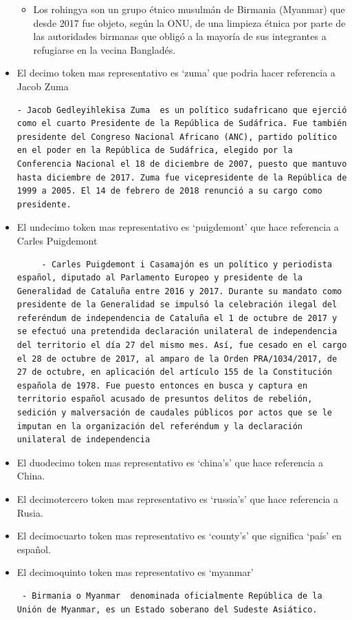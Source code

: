 \documentclass[
  11pt,
  a4paper,
]{article}
\providecommand{\tightlist}{%
  \setlength{\itemsep}{0pt}\setlength{\parskip}{0pt}}
\begin{document}
\begin{itemize}
  \begin{itemize}
  \tightlist
  \item
    Los rohingya son un grupo étnico musulmán de Birmania (Myanmar) que
    desde 2017 fue objeto, según la ONU, de una limpieza étnica por
    parte de las autoridades birmanas que obligó a la mayoría de sus
    integrantes a refugiarse en la vecina Bangladés.
  \end{itemize}
\item
  El decimo token mas representativo es `zuma' que podria hacer
  referencia a Jacob Zuma

\begin{verbatim}
- Jacob Gedleyihlekisa Zuma  es un político sudafricano que ejerció como el cuarto Presidente de la República de Sudáfrica. Fue también presidente del Congreso Nacional Africano (ANC), partido político en el poder en la República de Sudáfrica, elegido por la Conferencia Nacional el 18 de diciembre de 2007, puesto que mantuvo hasta diciembre de 2017. Zuma fue vicepresidente de la República de 1999 a 2005. El 14 de febrero de 2018 renunció a su cargo como presidente.
\end{verbatim}
\item
  El undecimo token mas representativo es `puigdemont' que hace
  referencia a Carles Puigdemont

\begin{verbatim}
     - Carles Puigdemont i Casamajón es un político y periodista español, diputado al Parlamento Europeo y presidente de la Generalidad de Cataluña entre 2016 y 2017. Durante su mandato como presidente de la Generalidad se impulsó la celebración ilegal del referéndum de independencia de Cataluña el 1 de octubre de 2017 y se efectuó una pretendida declaración unilateral de independencia del territorio el día 27 del mismo mes. Así, fue cesado en el cargo el 28 de octubre de 2017, al amparo de la Orden PRA/1034/2017, de 27 de octubre, en aplicación del artículo 155 de la Constitución española de 1978. Fue puesto entonces en busca y captura en territorio español acusado de presuntos delitos de rebelión, sedición y malversación de caudales públicos por actos que se le imputan en la organización del referéndum y la declaración unilateral de independencia
\end{verbatim}
\item
  El duodecimo token mas representativo es `china's' que hace referencia
  a China.
\item
  El decimotercero token mas representativo es `russia's' que hace
  referencia a Rusia.
\item
  El decimocuarto token mas representativo es `county's' que significa
  `país' en español.
\item
  El decimoquinto token mas representativo es `myanmar'

\begin{verbatim}
 - Birmania o Myanmar  denominada oficialmente República de la Unión de Myanmar, es un Estado soberano del Sudeste Asiático. 
\end{verbatim}
\end{itemize}
\end{document}
